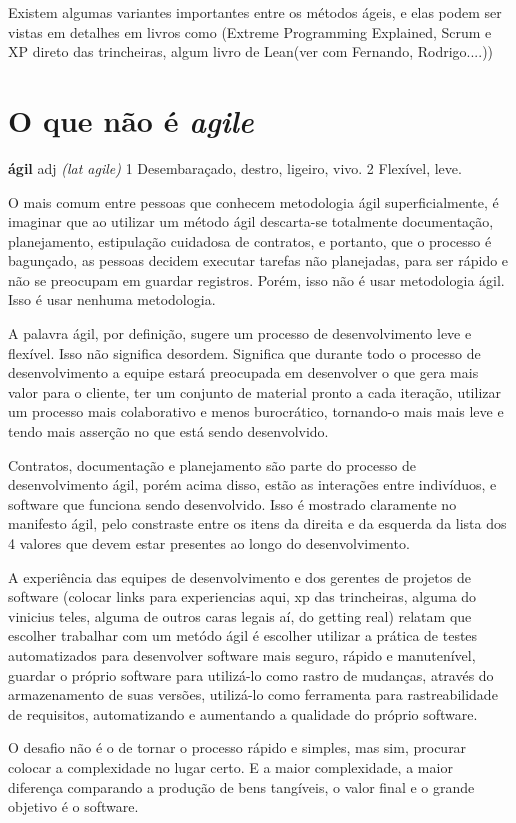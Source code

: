 \documentclass[a4paper,11pt,abntfigtabnum,noindentfirst]{abnt}
\begin{document}
Existem algumas variantes importantes entre os métodos ágeis, e elas podem ser vistas em detalhes em livros como (Extreme Programming Explained, Scrum e XP direto das trincheiras, algum livro de Lean(ver com Fernando, Rodrigo....))

\section {O que não é \textsl{agile}}

\begin{center}\textbf{ágil} adj \textsl{(lat agile)} 1 Desembaraçado, destro, ligeiro, vivo. 2 Flexível, leve.  \end{center}

O mais comum entre pessoas que conhecem metodologia ágil superficialmente, é imaginar que ao utilizar um método ágil descarta-se totalmente documentação, planejamento, estipulação cuidadosa de contratos, e portanto, que o processo é bagunçado, as pessoas decidem executar tarefas não planejadas, para ser rápido e não se preocupam em guardar registros. Porém, isso não é usar metodologia ágil. Isso é usar nenhuma metodologia. 

A palavra ágil, por definição, sugere um processo de desenvolvimento leve e flexível. Isso não significa desordem. Significa que durante todo o processo de desenvolvimento a equipe estará preocupada em desenvolver o que gera mais valor para o cliente, ter um conjunto de material pronto a cada iteração, utilizar um processo mais colaborativo e menos burocrático, tornando-o mais mais leve e tendo mais asserção no que está sendo desenvolvido.

Contratos, documentação e planejamento são parte do processo de desenvolvimento ágil, porém acima disso, estão as interações entre indivíduos, e software que funciona sendo desenvolvido. Isso é mostrado claramente no manifesto ágil, pelo constraste entre os itens da direita e da esquerda da lista dos 4 valores que devem estar presentes ao longo do desenvolvimento.

A experiência das equipes de desenvolvimento e dos gerentes de projetos de software (colocar links para experiencias aqui, xp das trincheiras, alguma do vinicius teles, alguma de outros caras legais aí, do getting real) relatam que escolher trabalhar com um metódo ágil é escolher utilizar a prática de testes automatizados para desenvolver software mais seguro, rápido e manutenível, guardar o próprio software para utilizá-lo como rastro de mudanças, através do armazenamento de suas versões, utilizá-lo como ferramenta para rastreabilidade de requisitos, automatizando e aumentando a qualidade do próprio software. 

O desafio não é o de tornar o processo rápido e simples, mas sim, procurar colocar a complexidade no lugar certo. E a maior complexidade, a maior diferença comparando a produção de bens tangíveis, o valor final e o grande objetivo é o software.



\end{document}
